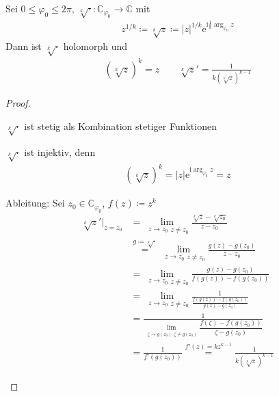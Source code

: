 \begin{theorem}[Satz]
  Sei $0 \leq \varphi_0 \leq 2 \pi$, $\sqrt[k]{\cdot} : \mathbb{C}_{\varphi_0} \to \mathbb{C}$ mit
  \begin{align*}
    z^{1/k} \coloneq \sqrt[k]{z} \coloneq |z|^{1/k} \mathrm{e}^{\mathrm{i}\frac{1}{k}\arg_{\varphi_0}z}
  \end{align*}
  Dann ist $\sqrt[k]{\cdot}$ holomorph und
  \begin{align*}
    (\sqrt[k]{z})^k = z \qquad \sqrt[k]{z}' = \frac{1}{k (\sqrt[k]{z})^{k-1}}
  \end{align*}
  
  \begin{proof}
    \begin{enum-arab}
      \item $\sqrt[k]{\cdot}$ ist stetig als Kombination stetiger Funktionen
      
      \item $\sqrt[k]{\cdot}$ ist injektiv, denn
      \begin{align*}
        (\sqrt[k]{z})^k = |z| \mathrm{e}^{\mathrm{i} \arg_{\varphi_0}z} = z
      \end{align*}
      
      \item Ableitung: Sei $z_0 \in \mathbb{C}_{\varphi_0}$, $f(z) \coloneq z^k$
      \begin{align*}
        \sqrt[k]{z}'\Big|_{z=z_0} &= \lim\limits_{\substack{z \to z_0}{z \neq z_0}} \frac{\sqrt[k]{z} - \sqrt[k]{z_0}}{z-z_0} \\
        &\overset{g \coloneq \sqrt[k]{\cdot}}{=} \lim\limits_{\substack{z \to z_0}{z \neq z_0}} \frac{g(z) - g(z_0)}{z-z_0} \\
        &= \lim\limits_{\substack{z \to z_0}{z \neq z_0}} \frac{g(z) - g(z_0)}{f(g(z)) - f(g(z_0))} \\
        &= \lim\limits_{\substack{z \to z_0}{z \neq z_0}} \frac{1}{\frac{f(g(z)) - f(g(z_0))}{g(z) - g(z_0)}} \\
        &= \frac{1}{\lim\limits_{\substack{\zeta \to g(z_0)}{\zeta \neq g(z_0)}} \dfrac{f(\zeta) - f(g(z_0))}{\zeta - g(z_0)}} \\
        &= \frac{1}{f'(g(z_0))} \overset{f'(z)=k z^{k-1}}{=} \frac{1}{k (\sqrt[k]{z})^{k-1}}
      \end{align*}
    \end{enum-arab}
  \end{proof}
\end{theorem}

